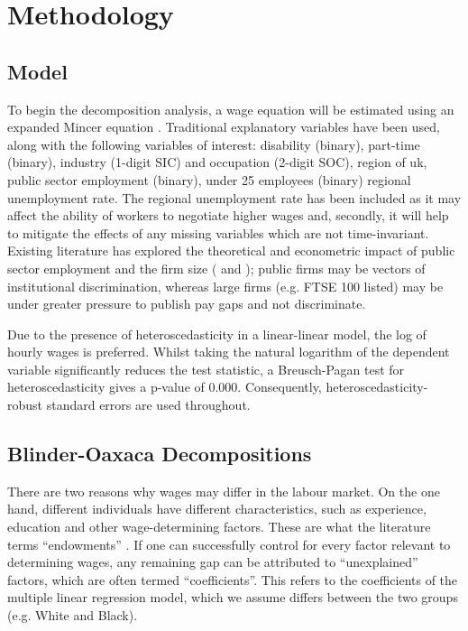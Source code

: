 \documentclass[class=article, crop=false]{standalone}
\begin{document}
\section{Methodology}
\label{sec:Methodology}
\subsection{Model}
\label{sec:Model}
To begin the decomposition analysis, a wage equation will be estimated using an expanded Mincer equation \citep{MincerA}. Traditional explanatory variables have been used, along with the following variables of interest: disability (binary), part-time (binary), industry (1-digit SIC) and occupation (2-digit SOC), region of \acrshort{uk}, public sector employment (binary), under 25 employees (binary) regional unemployment rate. The regional unemployment rate has been included as it may affect the ability of workers to negotiate higher wages \citep{Bell} and, secondly, it will help to mitigate the effects of any missing variables which are not time-invariant. Existing literature has explored the theoretical and econometric impact of public sector employment and the firm size (\citet{Longhi} and \citet{Longhi3}); public firms may be vectors of institutional discrimination, whereas large firms (e.g. FTSE 100 listed) may be under greater pressure to publish pay gaps and not discriminate. %

Due to the presence of heteroscedasticity in a linear-linear model, the log of hourly wages is preferred. Whilst taking the natural logarithm of the dependent variable significantly reduces the test statistic, a Breusch-Pagan test for heteroscedasticity gives a p-value of 0.000. Consequently, heteroscedasticity-robust standard errors are used throughout.

\subsection{Blinder-Oaxaca Decompositions}
\label{sec:B_O_Decomp}
There are two reasons why wages may differ in the labour market. On the one hand, different individuals have different characteristics, such as experience, education and other wage-determining factors. These are what the literature terms \enquote{endowments} \citep{Blinder}. If one can successfully control for every factor relevant to determining wages, any remaining gap can be attributed to \enquote{unexplained} factors, which are often termed \enquote{coefficients}. This refers to the coefficients of the multiple linear regression model, which we assume differs between the two groups (e.g. White and Black). %
\end{document}
